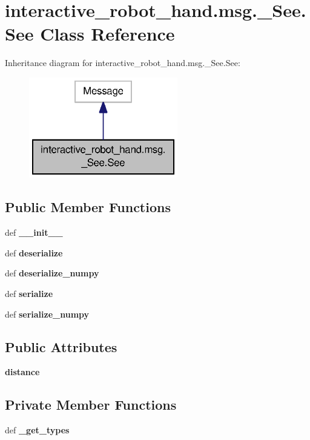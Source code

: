 \section{interactive\-\_\-robot\-\_\-hand.\-msg.\-\_\-\-See.\-See Class Reference}
\label{classinteractive__robot__hand_1_1msg_1_1__See_1_1See}


Inheritance diagram for interactive\-\_\-robot\-\_\-hand.\-msg.\-\_\-\-See.\-See\-:\nopagebreak
\begin{figure}[H]
\begin{center}
\leavevmode
\includegraphics[width=184pt]{classinteractive__robot__hand_1_1msg_1_1__See_1_1See__inherit__graph}
\end{center}
\end{figure}
\subsection*{Public Member Functions}
\begin{DoxyCompactItemize}
\item 
def {\bf \-\_\-\-\_\-init\-\_\-\-\_\-}
\item 
def {\bf deserialize}
\item 
def {\bf deserialize\-\_\-numpy}
\item 
def {\bf serialize}
\item 
def {\bf serialize\-\_\-numpy}
\end{DoxyCompactItemize}
\subsection*{Public Attributes}
\begin{DoxyCompactItemize}
\item 
{\bf distance}
\end{DoxyCompactItemize}
\subsection*{Private Member Functions}
\begin{DoxyCompactItemize}
\item 
def {\bf \-\_\-get\-\_\-types}
\end{DoxyCompactItemize}

